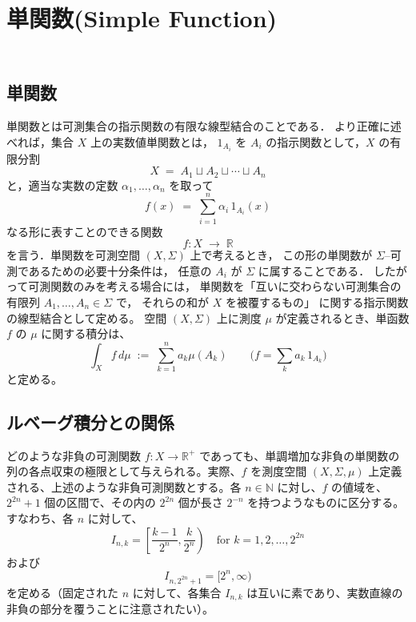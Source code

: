 \section{\\単関数(Simple Function)}

\subsection{\\単関数\cite{kingman1966introduction}}
  単関数とは可測集合の指示関数の有限な線型結合のことである．
  より正確に述べれば，集合 $X$ 上の実数値単関数とは，
  $1_{A_i}$ を $A_i$ の指示関数として，$X$ の有限分割
  \[
    X \;=\; A_1 \sqcup A_2 \sqcup \dotsb \sqcup A_n
  \]
  と，適当な実数の定数 $\alpha_1, \dots, \alpha_n$ を取って
  \[
    f(x) \;=\; \sum_{i=1}^{n} \alpha_i\, 1_{A_i}(x)
  \]
  なる形に表すことのできる関数 
  \[
    f \colon X \;\longrightarrow\; \mathbb{R}
  \]
  を言う．単関数を可測空間 $(X,\Sigma)$ 上で考えるとき，
  この形の単関数が $\Sigma$–可測であるための必要十分条件は，
  任意の $A_i$ が $\Sigma$ に属することである．
  したがって可測関数のみを考える場合には，
  単関数を「互いに交わらない可測集合の有限列
  $A_1,\dots,A_n \in \Sigma$ で，
  それらの和が $X$ を被覆するもの」
  に関する指示関数の線型結合として定める。
  空間 $(X,\Sigma)$ 上に測度 $\mu$ が定義されるとき、単函数 $f$ の $\mu$ に関する積分は、
\[
  \int_X f \, d\mu \;:=\; \sum_{k=1}^{n} a_k \mu(A_k)
  \qquad\bigl(f = \sum_{k} a_k\,1_{A_k}\bigr)
\]
と定める。%

\subsection{ルベーグ積分との関係\cite{ito1963lebesgue}}
  どのような非負の可測関数 $f: X \to \mathbb{R}^{+}$ であっても、単調増加な非負の単関数の列の各点収束の極限として与えられる。実際、$f$ を測度空間 $(X, \Sigma, \mu)$ 上定義される、上述のような非負可測関数とする。各 $n \in \mathbb{N}$ に対し、$f$ の値域を、$2^{2n} + 1$ 個の区間で、その内の $2^{2n}$ 個が長さ $2^{-n}$ を持つようなものに区分する。すなわち、各 $n$ に対して、
  \[
  I_{n,k} = \left[ \frac{k-1}{2^n}, \frac{k}{2^n} \right) \quad \text{for } k = 1, 2, \ldots, 2^{2n}
  \]
  および
  \[
  I_{n, 2^{2n}+1} = [2^n, \infty)
  \]
  を定める（固定された $n$ に対して、各集合 $I_{n,k}$ は互いに素であり、実数直線の非負の部分を覆うことに注意されたい）。
  
